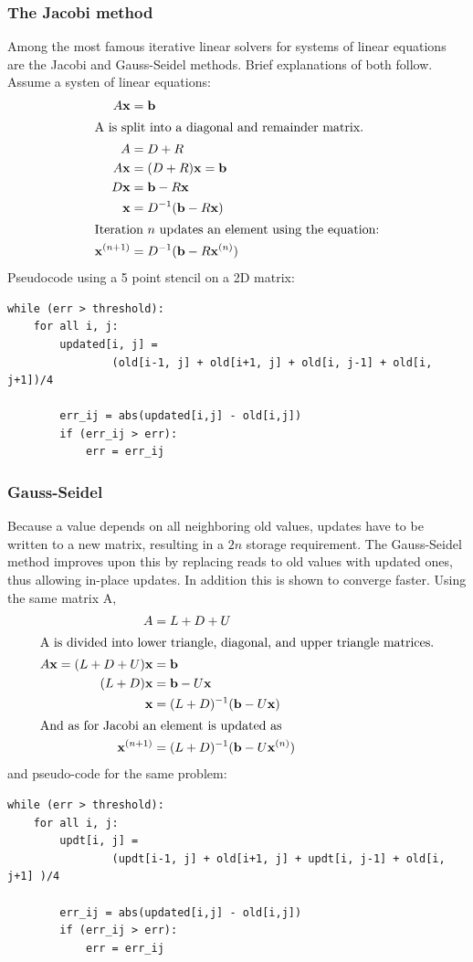 \subsubsection*{The Jacobi method}
Among the most famous iterative linear solvers for systems of linear equations are the Jacobi and Gauss-Seidel methods.
Brief explanations of both follow. Assume a systen of linear equations:
\begin{align*}
	A \mathbf{x} &= \mathbf{b}\\
\intertext{A is split into a diagonal and remainder matrix.}
	A &= D+R\\
	A\mathbf{x} &= (D+R)\mathbf{x} = \mathbf{b}\\
	D\mathbf{x} &= \mathbf{b} - R\mathbf{x}\\
	\mathbf{x} &= D^{-1}(\mathbf{b} - R\mathbf{x})\\
\intertext{Iteration $n$ updates an element using the equation:}
	\mathbf{x}^{(n+1)} &= D^{-1}(\mathbf{b} - R\mathbf{x}^{(n)})\\
\end{align*}
Pseudocode using a 5 point stencil on a 2D matrix:
\begin{lstlisting}
while (err > threshold):
	for all i, j:
		updated[i, j] =
				(old[i-1, j] + old[i+1, j] + old[i, j-1] + old[i, j+1])/4
		
		err_ij = abs(updated[i,j] - old[i,j])
		if (err_ij > err):
			err = err_ij
\end{lstlisting}

\subsubsection*{Gauss-Seidel} 
Because a value depends on all neighboring old values, updates have to be written to a new matrix, resulting in a $2n$
storage requirement. The Gauss-Seidel method improves upon this by replacing reads to old values with updated ones, thus
allowing in-place updates. In addition this is shown to converge faster. Using the same matrix A,
\begin{align*}
	A &= L + D + U\\
\intertext{A is divided into lower triangle, diagonal, and upper triangle matrices.}
	A\mathbf{x} = (L + D + U)\mathbf{x} &= \mathbf{b}\\
	(L+D)\mathbf{x} &= \mathbf{b}-U\mathbf{x}\\
	\mathbf{x} &= (L+D)^{-1}(\mathbf{b}-U\mathbf{x})\\
\intertext{And as for Jacobi an element is updated as}
	\mathbf{x}^{(n+1)} &= (L+D)^{-1}(\mathbf{b}-U\mathbf{x}^{(n)})\\
\end{align*}
and pseudo-code for the same problem:
\begin{lstlisting}
while (err > threshold):
	for all i, j:
		updt[i, j] =
				(updt[i-1, j] + old[i+1, j] + updt[i, j-1] + old[i, j+1] )/4
		
		err_ij = abs(updated[i,j] - old[i,j])
		if (err_ij > err):
			err = err_ij
\end{lstlisting}

